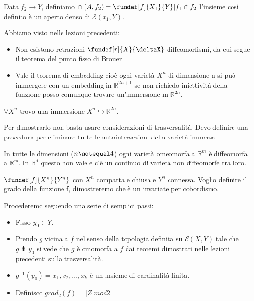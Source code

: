 \begin{teo}
Data $f_{2} \rightarrow Y$, definiamo $\pitchfork(A, f_{2}) = {\fundef[f]{X_{1}}{Y} | f_{1} \pitchfork f_{2}}$ l'insieme così definito è un aperto denso di $\mathcal{E}(x_{1}, Y)$.
\end{teo}

Abbiamo visto nelle lezioni precedenti:

\begin{itemize}
 \item Non esistono retrazioni $\fundef[r]{X}{\deltaX}$ diffeomorfismi, da cui segue il teorema del punto fisso di Brouer
 \item Vale il teorema di embedding cioè ogni varietà $X^{n}$ di dimensione n si può immergere con un embedding in $\mathbb{R}^{2n+1}$ se non richiedo iniettività della funzione 
 posso comunque trovare un'immersione in $\mathbb{R}^{2n}$. 
\end{itemize}

\begin{teo}  
$\forall X^{n}$ trovo una immersione $X^{n} \hookrightarrow \mathbb{R}^{2n}$.
\end{teo}

\begin{oss}
 Per dimostrarlo non basta usare considerazioni di trasversalità. Devo definire una procedura per eliminare tutte le autointersezioni della varietà immersa.
\end{oss}

\begin{oss} %
 In tutte le dimensioni ($n \notequal 4$) ogni varietà omeomorfa a $\mathbb{R}^{m}$ è diffeomorfa a  $\mathbb{R}^{m}$. In $\mathbb{R}^{4}$ questo non vale e c'è un continuo di varietà 
 non diffeomorfe tra loro.
\end{oss}

$\fundef[f]{X^{n}}{Y^{n}}$ con $X^{n}$ compatta e chiusa e $Y^{n}$ connessa. Voglio definire il grado della funzione f, dimostreremo che è un invariate per cobordismo.

\begin{def}

\end{def}

\begin{def}
Procederemo seguendo una serie di semplici passi:
\begin{itemize}
 \item Fisso $y_{0} \in Y$.
 \item Prendo $g$ vicina a $f$ nel senso della topologia definita su $\mathcal{E}(X, Y)$ tale che $g \pitchfork {y_{0}}$ si vede che $g$ è 
 omomorfa a $f$ dai teoremi dimostrati nelle lezioni precedenti sulla trasversalità.
 \item $g^{-1}(y_{0}) = {x_{1}, x_{2}, ..., x_{k}}$ è un insieme di cardinalità finita.
 \item Definisco $grad_{2}(f) = |Z| mod 2$
\end{itemize}
\end{def}

